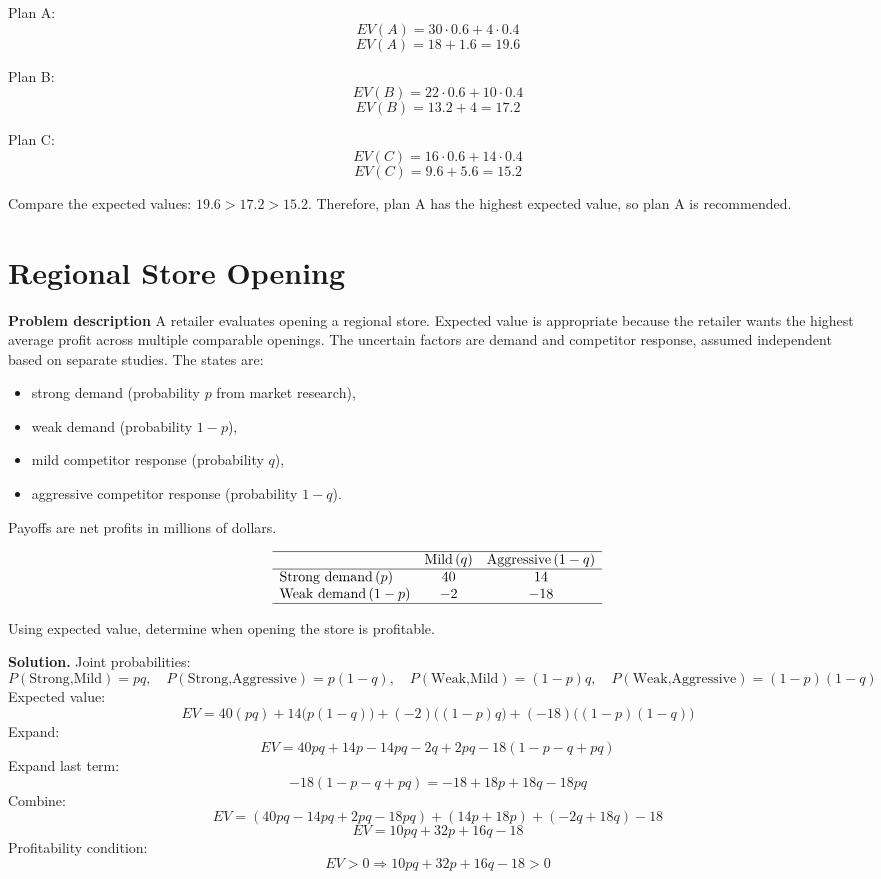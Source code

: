 \begin{ExamProblems}
		Plan A:
		\[
		EV(A)=30\cdot 0.6 + 4\cdot 0.4
		\]
		\[
		EV(A)=18 + 1.6 = 19.6
		\]
		
		Plan B:
		\[
		EV(B)=22\cdot 0.6 + 10\cdot 0.4
		\]
		\[
		EV(B)=13.2 + 4 = 17.2
		\]
		
		Plan C:
		\[
		EV(C)=16\cdot 0.6 + 14\cdot 0.4
		\]
		\[
		EV(C)=9.6 + 5.6 = 15.2
		\]
		
		Compare the expected values: \(19.6>17.2>15.2\). Therefore, plan A has the highest expected value, so plan A is recommended.
		
		
		\hypertarget{c7-ex8}{}
		\item
		\section{Regional Store Opening}
		
		\textbf{Problem description}
		A retailer evaluates opening a regional store. Expected value is appropriate because the retailer wants the highest average profit across multiple comparable openings. The uncertain factors are demand and competitor response, assumed independent based on separate studies. The states are:
		\begin{itemize}
			\item strong demand (probability \(p\) from market research),
			\item weak demand (probability \(1-p\)),
			\item mild competitor response (probability \(q\)),
			\item aggressive competitor response (probability \(1-q\)).
		\end{itemize}
		Payoffs are net profits in millions of dollars.
		
		\[
		\begin{array}{lcc}
			\hline
			& \text{Mild}\,(q) & \text{Aggressive}\,(1-q) \\
			\hline
			\text{Strong demand}\,(p) & 40 & 14 \\
			\text{Weak demand}\,(1-p) & -2 & -18 \\
			\hline
		\end{array}
		\]
		
		Using expected value, determine when opening the store is profitable.
		
		\textbf{Solution.}
		Joint probabilities:
		\[
		P(\text{Strong,Mild})=pq,\quad
		P(\text{Strong,Aggressive})=p(1-q),\quad
		P(\text{Weak,Mild})=(1-p)q,\quad
		P(\text{Weak,Aggressive})=(1-p)(1-q)
		\]
		Expected value:
		\[
		EV=40(pq)+14\bigl(p(1-q)\bigr)+(-2)\bigl((1-p)q\bigr)+(-18)\bigl((1-p)(1-q)\bigr)
		\]
		Expand:
		\[
		EV=40pq + 14p - 14pq - 2q + 2pq - 18(1-p-q+pq)
		\]
		Expand last term:
		\[
		-18(1-p-q+pq)=-18 + 18p + 18q - 18pq
		\]
		Combine:
		\[
		EV=(40pq-14pq+2pq-18pq) + (14p+18p) + (-2q+18q) - 18
		\]
		\[
		EV=10pq + 32p + 16q - 18
		\]
		Profitability condition:
		\[
		EV>0 \Rightarrow 10pq+32p+16q-18>0
		\]
		

\end{ExamProblems}
